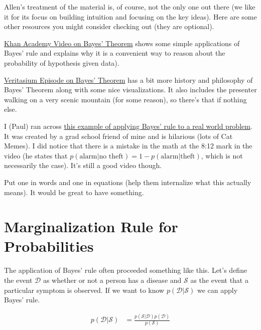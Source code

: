 \documentclass[assignment01_Solutions]{subfiles}
\begin{document}
\begin{externalresources}[(60 minutes)]
Allen's treatment of the material is, of course, not the only one out there (we like it for its focus on building intuition and focusing on the key ideas).  Here are some other resources you might consider checking out (they are optional).
\bi
\item \href{https://www.khanacademy.org/partner-content/wi-phi/wiphi-critical-thinking/wiphi-fundamentals/v/bayes-theorem}{Khan Academy Video on Bayes' Theorem} shows some simple applications of Bayes' rule and explains why it is a convenient way to reason about the probability of hypothesis given data).
\item \href{https://www.youtube.com/watch?v=R13BD8qKeTg}{Veritasium Episode on Bayes' Theorem} has a bit more history and philosophy of Bayes' Theorem along with some nice visualizations.  It also includes the presenter walking on a very scenic mountain (for some reason), so there's that if nothing else.
\item I (Paul) ran across \href{https://youtube.com/watch?v=nvqXXlz-rx0}{this example of applying Bayes' rule to a real world problem}.  It was created by a grad school friend of mine and is hilarious (lots of Cat Memes).  I did notice that there is a mistake in the math at the 8:12 mark in the video (he states that $p(\mbox{alarm} | \mbox{no theft}) = 1 - p(\mbox{alarm} | \mbox{theft})$, which is not necessarily the case).  It's still a good video though.
\ei

\end{externalresources}

\begin{exercise}
Put one in words and one in equations (help them internalize what this actually means).
It would be great to have something.
\end{exercise}

\section{Marginalization Rule for Probabilities}
The application of Bayes' rule often proceeded something like this.  Let's define the event $\mathcal{D}$ as whether or not a person has a disease and $\mathcal{S}$ as the event that a particular symptom is observed.  If we want to know $p(\mathcal{D} | \mathcal{S})$ we can apply Bayes' rule.

\begin{align}
p(\mathcal{D} | \mathcal{S}) &= \frac{p(\mathcal{S} | \mathcal{D}) p(\mathcal{D})}{p(\mathcal{S})} \label{eq:bayesdenominator}
\end{align}
\end{document}
